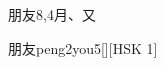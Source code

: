 \begin{entry}{朋友}{8,4}{⽉、⼜}
  \begin{phonetics}{朋友}{peng2you5}[][HSK 1]
  \end{phonetics}
\end{entry}
